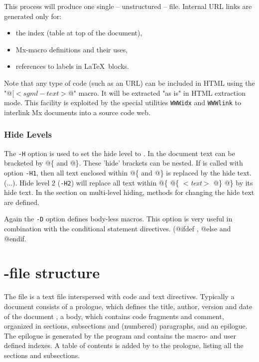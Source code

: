 \documentclass{article}
\begin{document}
This process will produce one single -- unstructured -- file. Internal
URL links are generated only for: 
\begin{itemize}
\item the index (table at top of the document),
\item Mx-macro definitions and their uses, 
\item references to labels in \LaTeX\ blocks.
\end{itemize}
Note that any type of code (such as an URL) can be included in HTML
using the "@[$<sgml-text>$@" macro. It will be extracted "as is" in HTML
extraction mode. This facility is exploited by the special utilities 
{\tt WWWidx} and {\tt WWWlink} to interlink Mx documents into a source code
web.

\subsubsection{Hide Levels}
The {\tt -H\n} option is used to set the hide level to \n. In the \Mx
document text can be bracketed by @\{ and @\}. These 'hide'
brackets can be nested. If \Mx is called with option {\tt -H1}, then
all text enclosed within @\{ and @\} is replaced by the hide text.
(...). Hide level 2 ({\tt -H2}) will replace all text within 
@\{ @\{ {\it $<$text$>$} @\} @\} by its hide text. 
In the section on multi-level hiding, methods for changing the hide
text are defined.

Again the {\tt -D\macro} option defines body-less macros.
This option is very useful in combination with the conditional
statement directives. (@ifdef \macro, @else and @endif.

\section{\Mx-file structure}
The \Mx file is a text file interspersed with code and text directives.
Typically a \Mx document consists of a prologue, which defines the
title, author, version and date of the document , a body, which
contains code fragments and comment, organized in sections,
subsections and (numbered) paragraphs, and an epilogue. The epilogue
is generated by the \Mx program and contains the macro- and user
defined indexes. A table of contents is added by \Mx to the prologue,
listing all the sections and subsections.
\end{document}
